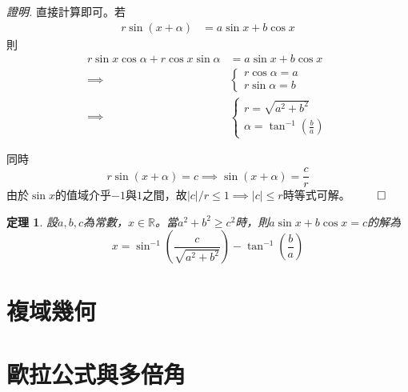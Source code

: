 \documentclass[12pt]{article}
\newtheorem*{theorem}{定理}
\renewenvironment*{proof}{\textit{證明.}}{\hfill$\qed$}
\begin{document}
    \begin{proof}
        直接計算即可。若\begin{align*}
            r\sin(x+\alpha)&=a\sin{x}+b\cos{x}
        \end{align*}
        則\begin{align*}
            r\sin{x}\cos{\alpha}+r\cos{x}\sin{\alpha}&=a\sin{x}+b\cos{x}\\
            \implies&\begin{cases}
                r\cos{\alpha}=a\\
                r\sin{\alpha}=b
            \end{cases}\\
            \implies&\begin{cases}
                r=\sqrt{a^2+b^2}\\
                \alpha=\tan^{-1}(\frac{b}{a})
            \end{cases}
        \end{align*}

        同時$$r\sin(x+\alpha)=c\implies \sin(x+\alpha)=\frac{c}{r}$$
        由於$\sin{x}$的值域介乎$-1$與$1$之間，故$|c|/r\leq 1\implies |c|\leq r$時等式可解。
    \end{proof}

    \begin{theorem}
        設$a,b,c$為常數，$x\in\mathbb{R}$。當$a^2+b^2\geq c^2$時，則$a\sin{x}+b\cos{x}=c$的解為$$x=\sin^{-1}(\frac{c}{\sqrt{a^2+b^2}})-\tan^{-1}(\frac{b}{a})$$
    \end{theorem}

    \section*{複域幾何}

    \section*{歐拉公式與多倍角}
\end{document}
